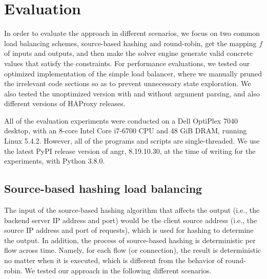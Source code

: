 \section{Evaluation}

In order to evaluate the approach in different scenarios, we focus on two common
load balancing schemes, source-based hashing and round-robin, get the mapping
$f$ of inputs and outputs, and then make the solver engine generate valid
concrete values that satisfy the constraints. For performance evaluations, we
tested our optimized implementation of the simple load balancer, where we
manually pruned the irrelevant code sections so as to prevent unnecessary state
exploration. We also tested the unoptimized version with and without argument
parsing, and also different versions of HAProxy releases.

All of the evaluation experiments were conducted on a Dell OptiPlex 7040
desktop, with an 8-core Intel Core i7-6700 CPU and 48 GiB DRAM, running Linux
5.4.2. However, all of the programs and scripts are single-threaded. We use the
latest PyPI release version of angr, 8.19.10.30, at the time of writing for the
experiments, with Python 3.8.0.


\subsection{Source-based hashing load balancing}

The input of the source-based hashing algorithm that affects the output (i.e.,
the backend server IP address and port) would be the client source address
(i.e., the source IP address and port of requests), which is used for hashing to
determine the output. In addition, the process of source-based hashing is
deterministic per flow across time. Namely, for each flow (or connection), the
result is deterministic no matter when it is executed, which is different from
the behavior of round-robin. We tested our approach in the following different
scenarios.

